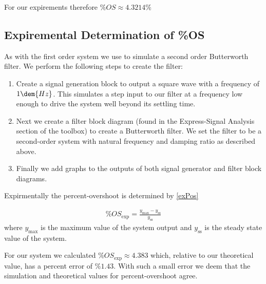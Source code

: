 \documentclass[main.tex]{subfile}
\begin{document}
For our expirements therefore $\%OS \approx 4.3214 \%$

\subsection{Expiremental Determination of \%OS}
\label{sec:expiremental_determination_of_}

As with the first order system we use \Labview to simulate a second order
Butterworth filter. We perform the following steps to create the filter: 

\begin{enumerate}
	\item Create a signal generation block to output a square wave with a
		frequency of $1\dem{Hz}$. This simulates a step input to our filter at
		a frequency low enough to drive the system well beyond its settling time.
	\item Next we create a filter block diagram (found in the Express-Signal
		Analysis section of the toolbox) to create a Butterworth filter. We set the
		filter to be a second-order system with natural frequency and damping ratio
		as described above.
	\item Finally we add graphs to the outputs of both signal generator and filter
		block diagrams.
\end{enumerate}

Expirmentally the percent-overshoot is determined by \eqref{exPos}

\begin{align}
	\%OS_{\text{exp}} = \frac{y_{\text{max}} - y_{\text{ss}}}{y_{\text{ss}}}
\end{align}
where $y_{\text{max}}$ is the maximum value of the system output and
$y_{\text{ss}}$ is the steady state value of the system.

For our system we calculated $\%OS_{\text{exp}} \approx 4.383$ which, relative
to our theoretical value, has a percent error of $\%1.43$. With such a small
error we deem that the simulation and theoretical values for percent-overshoot
agree. 



\end{document}

